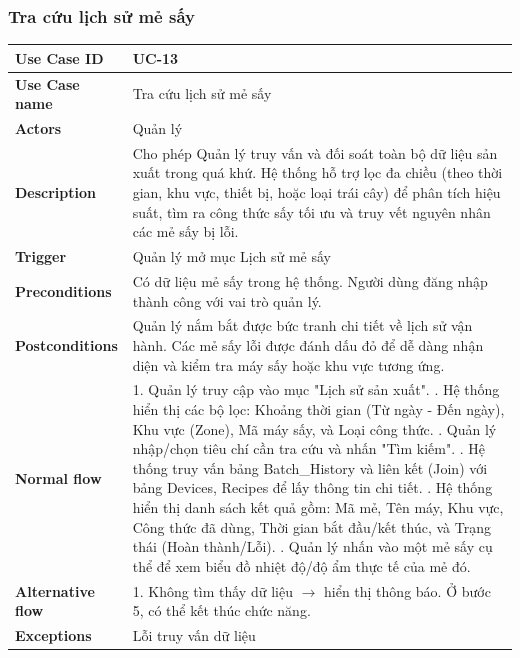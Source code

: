 \subsubsection{Tra cứu lịch sử mẻ sấy}
\begin{tabular}{|p{3.5cm}|p{11.25cm}|}
\hline
\textbf{Use Case ID} & UC-13 \\
\hline
\textbf{Use Case name} & Tra cứu lịch sử mẻ sấy \\
\hline
\textbf{Actors} & Quản lý \\
\hline
\textbf{Description} & 
Cho phép Quản lý truy vấn và đối soát toàn bộ dữ liệu sản xuất trong quá khứ. Hệ thống hỗ trợ lọc đa chiều (theo thời gian, khu vực, thiết bị, hoặc loại trái cây) để phân tích hiệu suất, tìm ra công thức sấy tối ưu và truy vết nguyên nhân các mẻ sấy bị lỗi. \\
\hline
\textbf{Trigger} & Quản lý mở mục Lịch sử mẻ sấy \\
\hline
\textbf{Preconditions} & Có dữ liệu mẻ sấy trong hệ thống. Người dùng đăng nhập thành công với vai trò quản lý. \\
\hline
\textbf{Postconditions} & Quản lý nắm bắt được bức tranh chi tiết về lịch sử vận hành. Các mẻ sấy lỗi được đánh dấu đỏ để dễ dàng nhận diện và kiểm tra máy sấy hoặc khu vực tương ứng. \\
\hline
\textbf{Normal flow} & 
1. Quản lý truy cập vào mục "Lịch sử sản xuất". \newline
2. Hệ thống hiển thị các bộ lọc: Khoảng thời gian (Từ ngày - Đến ngày), Khu vực (Zone), Mã máy sấy, và Loại công thức. \newline
3. Quản lý nhập/chọn tiêu chí cần tra cứu và nhấn "Tìm kiếm". \newline
4. Hệ thống truy vấn bảng Batch\_History và liên kết (Join) với bảng Devices, Recipes để lấy thông tin chi tiết. \newline
5. Hệ thống hiển thị danh sách kết quả gồm: Mã mẻ, Tên máy, Khu vực, Công thức đã dùng, Thời gian bắt đầu/kết thúc, và Trạng thái (Hoàn thành/Lỗi). \newline
6. Quản lý nhấn vào một mẻ sấy cụ thể để xem biểu đồ nhiệt độ/độ ẩm thực tế của mẻ đó. \\
\hline
\textbf{Alternative flow} & 
1. Không tìm thấy dữ liệu $\rightarrow$ hiển thị thông báo\newline
2. Ở bước 5, có thể kết thúc chức năng.\\
\hline
\textbf{Exceptions} & Lỗi truy vấn dữ liệu \\
\hline
\end{tabular}

